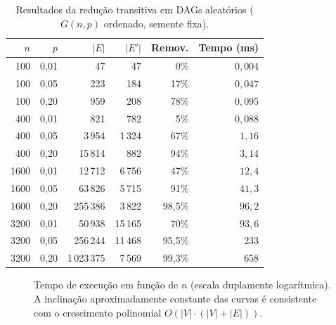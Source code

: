 \documentclass{sbc2023}%
\begin{document}
\begin{table}[t]
\centering
\caption{Resultados da redução transitiva em DAGs aleatórios ($G(n,p)$ ordenado, semente fixa).}
\label{tab:res}
\small
\begin{tabular}{rrrrrr}
\toprule
$n$ & $p$ & $|E|$ & $|E'|$ & Remov. & Tempo (ms)\\
\midrule
100  & 0{,}01 & 47      & 47    & 0\%     & $0{,}004$\\
100  & 0{,}05 & 223     & 184   & 17\%    & $0{,}047$\\
100  & 0{,}20 & 959     & 208   & 78\%    & $0{,}095$\\
400  & 0{,}01 & 821     & 782   & 5\%     & $0{,}088$\\
400  & 0{,}05 & 3\,954  & 1\,324 & 67\%   & $1{,}16$\\
400  & 0{,}20 & 15\,814 & 882   & 94\%    & $3{,}14$\\
1600 & 0{,}01 & 12\,712 & 6\,756 & 47\%   & $12{,}4$\\
1600 & 0{,}05 & 63\,826 & 5\,715 & 91\%   & $41{,}3$\\
1600 & 0{,}20 & 255\,386 & 3\,822 & 98{,}5\% & $96{,}2$\\
3200 & 0{,}01 & 50\,938 & 15\,165 & 70\%  & $93{,}6$\\
3200 & 0{,}05 & 256\,244 & 11\,468 & 95{,}5\% & $233$\\
3200 & 0{,}20 & 1\,023\,375 & 7\,569 & 99{,}3\% & $658$\\
\bottomrule
\end{tabular}
\end{table}

\begin{figure}[t]
\centering
{}
\caption{Tempo de execução em função de $n$ (escala duplamente logarítmica). A inclinação aproximadamente constante das curvas é consistente com o crescimento polinomial $O(|V|\cdot(|V|+|E|))$.}
\label{fig:tempo}
\end{figure}
\end{document}
